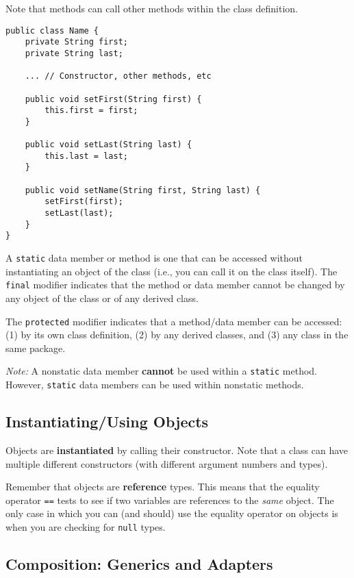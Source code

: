 \documentclass{article}
\newcommand{\nline}{\vspace{\baselineskip}}
\begin{document}
\begin{flushleft}
\nline

Note that methods can call other methods within the class definition. 

\begin{verbatim}
public class Name {
    private String first;
    private String last;
    
    ... // Constructor, other methods, etc
    
    public void setFirst(String first) {
        this.first = first;
    }
    
    public void setLast(String last) {
        this.last = last;
    }
    
    public void setName(String first, String last) {
        setFirst(first);
        setLast(last);
    }
}
\end{verbatim}

A \texttt{static} data member or method is one that can be accessed without instantiating an object of the class (i.e., you can call it on the class itself). The \texttt{final} modifier indicates that the method or data member cannot be changed by any object of the class or of any derived class.

\nline

The \texttt{protected} modifier indicates that a method/data member can be accessed: (1) by its own class definition, (2) by any derived classes, and (3) any class in the same package.

\nline

\textit{Note:} A nonstatic data member \textbf{cannot} be used within a \texttt{static} method. However, \texttt{static} data members can be used within nonstatic methods.

\subsection{Instantiating/Using Objects}

Objects are \textbf{instantiated} by calling their constructor. Note that a class can have multiple different constructors (with different argument numbers and types). 

\nline

Remember that objects are \textbf{reference} types. This means that the equality operator \texttt{==} tests to see if two variables are references to the \textit{same} object. The only case in which you can (and should) use the equality operator on objects is when you are checking for \texttt{null} types.

\subsection{Composition: Generics and Adapters}


\end{flushleft}
\end{document}
